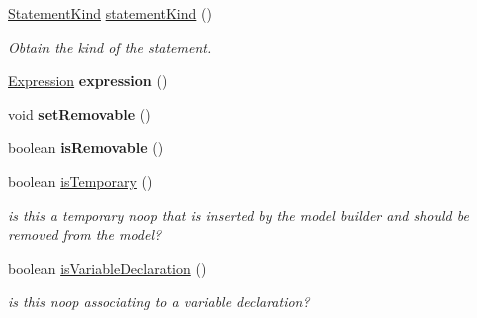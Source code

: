 \begin{DoxyCompactItemize}
\hyperlink{enumedu_1_1udel_1_1cis_1_1vsl_1_1civl_1_1model_1_1IF_1_1statement_1_1Statement_1_1StatementKind}{Statement\+Kind} \hyperlink{classedu_1_1udel_1_1cis_1_1vsl_1_1civl_1_1model_1_1common_1_1statement_1_1CommonNoopStatement_ae266613be199f4354a0381182581ef20}{statement\+Kind} ()
\begin{DoxyCompactList}\small\item\em Obtain the kind of the statement. \end{DoxyCompactList}\item 
\hypertarget{classedu_1_1udel_1_1cis_1_1vsl_1_1civl_1_1model_1_1common_1_1statement_1_1CommonNoopStatement_a3159c3360f109d0d20c09fceca4d955f}{}\hyperlink{interfaceedu_1_1udel_1_1cis_1_1vsl_1_1civl_1_1model_1_1IF_1_1expression_1_1Expression}{Expression} {\bfseries expression} ()\label{classedu_1_1udel_1_1cis_1_1vsl_1_1civl_1_1model_1_1common_1_1statement_1_1CommonNoopStatement_a3159c3360f109d0d20c09fceca4d955f}

\item 
\hypertarget{classedu_1_1udel_1_1cis_1_1vsl_1_1civl_1_1model_1_1common_1_1statement_1_1CommonNoopStatement_ad798d7067db745f592992d756e168cda}{}void {\bfseries set\+Removable} ()\label{classedu_1_1udel_1_1cis_1_1vsl_1_1civl_1_1model_1_1common_1_1statement_1_1CommonNoopStatement_ad798d7067db745f592992d756e168cda}

\item 
\hypertarget{classedu_1_1udel_1_1cis_1_1vsl_1_1civl_1_1model_1_1common_1_1statement_1_1CommonNoopStatement_aea98497d8d1887b3aed2b2139b2a0a0f}{}boolean {\bfseries is\+Removable} ()\label{classedu_1_1udel_1_1cis_1_1vsl_1_1civl_1_1model_1_1common_1_1statement_1_1CommonNoopStatement_aea98497d8d1887b3aed2b2139b2a0a0f}

\item 
boolean \hyperlink{classedu_1_1udel_1_1cis_1_1vsl_1_1civl_1_1model_1_1common_1_1statement_1_1CommonNoopStatement_ab71b50917e8821af03ed1944a93c9c74}{is\+Temporary} ()
\begin{DoxyCompactList}\small\item\em is this a temporary noop that is inserted by the model builder and should be removed from the model? \end{DoxyCompactList}\item 
boolean \hyperlink{classedu_1_1udel_1_1cis_1_1vsl_1_1civl_1_1model_1_1common_1_1statement_1_1CommonNoopStatement_a66dc2cac44bf6ccdea0f0f8ed72bb063}{is\+Variable\+Declaration} ()
\begin{DoxyCompactList}\small\item\em is this noop associating to a variable declaration? \end{DoxyCompactList}\end{DoxyCompactItemize}
